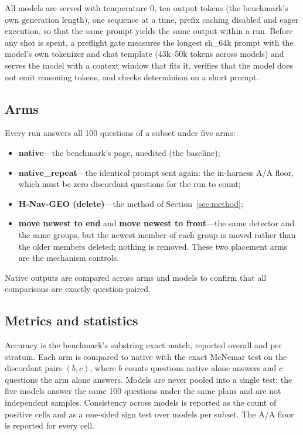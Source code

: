 \documentclass[journal=jcisd8,manuscript=article]{achemso}
\begin{document}
All models are served with temperature 0, ten output tokens (the benchmark's own generation length), one sequence at a time, prefix caching disabled and eager execution, so that the same prompt yields the same output within a run. Before any shot is spent, a preflight gate measures the longest sh\_64k prompt with the model's own tokenizer and chat template (43k--50k tokens across models) and serves the model with a context window that fits it, verifies that the model does not emit reasoning tokens, and checks determinism on a short prompt.

\subsection{Arms}

Every run answers all 100 questions of a subset under five arms:
\begin{itemize}
\item \textbf{native}---the benchmark's page, unedited (the baseline);
\item \textbf{native\_repeat}---the identical prompt sent again: the in-harness A/A floor, which must be zero discordant questions for the run to count;
\item \textbf{H-Nav-GEO (delete)}---the method of Section~\ref{sec:method};
\item \textbf{move newest to end} and \textbf{move newest to front}---the same detector and the same groups, but the newest member of each group is moved rather than the older members deleted; nothing is removed. These two placement arms are the mechanism controls.
\end{itemize}
Native outputs are compared across arms and models to confirm that all comparisons are exactly question-paired.

\subsection{Metrics and statistics}

Accuracy is the benchmark's substring exact match, reported overall and per stratum. Each arm is compared to native with the exact McNemar test on the discordant pairs $(b,c)$, where $b$ counts questions native alone answers and $c$ questions the arm alone answers. Models are never pooled into a single test: the five models answer the same 100 questions under the same plans and are not independent samples. Consistency across models is reported as the count of positive cells and as a one-sided sign test over models per subset. The A/A floor is reported for every cell.
\end{document}
